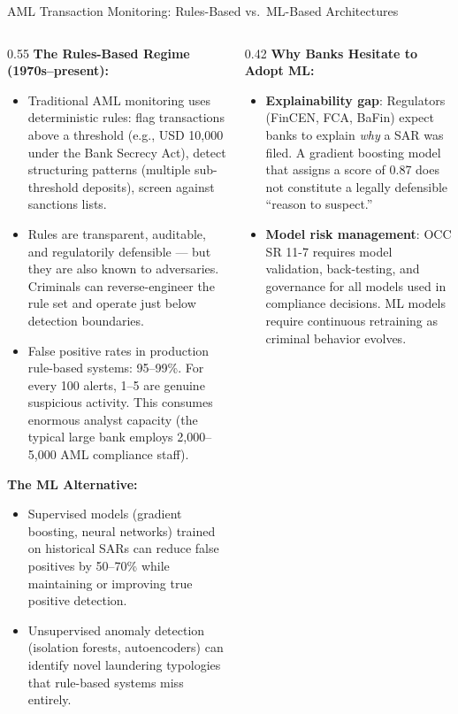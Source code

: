 
\begin{frame}{AML Transaction Monitoring: Rules-Based vs.\ ML-Based Architectures}
  \begin{columns}[T]
    \begin{column}{0.55\textwidth}
      \textbf{The Rules-Based Regime (1970s--present):}
      \begin{itemize}
        \item Traditional AML monitoring uses deterministic rules: flag transactions above a threshold (e.g., USD 10,000 under the Bank Secrecy Act), detect structuring patterns (multiple sub-threshold deposits), screen against sanctions lists.
        \item Rules are transparent, auditable, and regulatorily defensible --- but they are also known to adversaries. Criminals can reverse-engineer the rule set and operate just below detection boundaries.
        \item False positive rates in production rule-based systems: 95--99\%. For every 100 alerts, 1--5 are genuine suspicious activity. This consumes enormous analyst capacity (the typical large bank employs 2,000--5,000 AML compliance staff).
      \end{itemize}
      \vspace{0.3em}
      \textbf{The ML Alternative:}
      \begin{itemize}
        \item Supervised models (gradient boosting, neural networks) trained on historical SARs can reduce false positives by 50--70\% while maintaining or improving true positive detection.
        \item Unsupervised anomaly detection (isolation forests, autoencoders) can identify novel laundering typologies that rule-based systems miss entirely.
      \end{itemize}
    \end{column}
    \begin{column}{0.42\textwidth}
      \textbf{Why Banks Hesitate to Adopt ML:}
      \begin{itemize}
        \item \textbf{Explainability gap}: Regulators (FinCEN, FCA, BaFin) expect banks to explain \emph{why} a SAR was filed. A gradient boosting model that assigns a score of 0.87 does not constitute a legally defensible ``reason to suspect.''
        \item \textbf{Model risk management}: OCC SR 11-7 requires model validation, back-testing, and governance for all models used in compliance decisions. ML models require continuous retraining as criminal behavior evolves.

\end{itemize}
\end{column}
\end{columns}
\end{frame}
